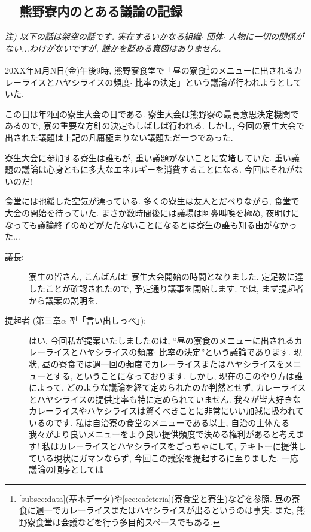 \documentclass[10pt,b5jsbook,dvips,dvipdfmx,openany]{jsbook}
\theoremstyle{definition}
\begin{document}
		\begin{multicols}{2}

		\subsection{---熊野寮内のとある議論の記録}
		\small
		\emph{注) 以下の話は架空の話です. 実在するいかなる組織$ \cdot $ 団体$ \cdot $ 人物に一切の関係がない...わけがないですが, 誰かを貶める意図はありません. }

		20XX年M月N日(金)午後9時, 熊野寮食堂で「昼の寮食\footnote{\ref{subsec:data}(基本データ)や\ref{sec:cafeteria}(寮食堂と寮生)などを参照. 昼の寮食に週一でカレーライスまたはハヤシライスが出るというのは事実. また, 熊野寮食堂は会議などを行う多目的スペースでもある. }のメニューに出されるカレーライスとハヤシライスの頻度$ \cdot $ 比率の決定」という議論が行われようとしていた.

		この日は年2回の寮生大会の日である. 寮生大会は熊野寮の最高意思決定機関であるので, 寮の重要な方針の決定もしばしば行われる. しかし, 今回の寮生大会で出された議題は上記の凡庸極まりない議題ただ一つであった.

		寮生大会に参加する寮生は誰もが, 重い議題がないことに安堵していた. 重い議題の議論は心身ともに多大なエネルギーを消費することになる. 今回はそれがないのだ!

		食堂には弛緩した空気が漂っている. 多くの寮生は友人とだべりながら, 食堂で大会の開始を待っていた. まさか数時間後には議場は阿鼻叫喚を極め, 夜明けになっても議論終了のめどがたたないことになるとは寮生の誰も知る由がなかった...

		\begin{description}

		\item[議長: ] 寮生の皆さん, こんばんは! 寮生大会開始の時間となりました. 定足数に達したことが確認されたので, 予定通り議事を開始します. では, まず提起者から議案の説明を.

		\item[提起者 (第三章$ \alpha $ 型「言い出しっぺ」): ] はい. 今回私が提案いたしましたのは, ``昼の寮食のメニューに出されるカレーライスとハヤシライスの頻度$ \cdot $ 比率の決定''という議論であります. 現状, 昼の寮食では週一回の頻度でカレーライスまたはハヤシライスをメニューとする, ということになっております. しかし, 現在のこのやり方は誰によって, どのような議論を経て定められたのか判然とせず, カレーライスとハヤシライスの提供比率も特に定められていません. 我々が皆大好きなカレーライスやハヤシライスは驚くべきことに非常にいい加減に扱われているのです. 私は自治寮の食堂のメニューである以上, 自治の主体たる我々がより良いメニューをより良い提供頻度で決める権利があると考えます! 私はカレーライスとハヤシライスをごっちゃにして, テキトーに提供している現状にガマンならず, 今回この議案を提起するに至りました. 一応議論の順序としては


\end{description}
\end{multicols}
\end{document}
